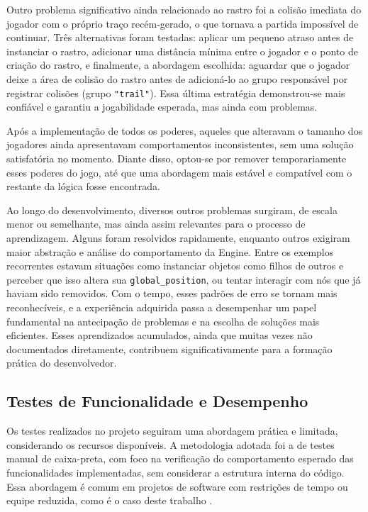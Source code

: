 Outro problema significativo ainda relacionado ao rastro foi a colisão imediata do jogador com o próprio traço recém-gerado, o que tornava a partida impossível de continuar. Três alternativas foram testadas: aplicar um pequeno atraso antes de instanciar o rastro, adicionar uma distância mínima entre o jogador e o ponto de criação do rastro, e finalmente, a abordagem escolhida: aguardar que o jogador deixe a área de colisão do rastro antes de adicioná-lo ao grupo responsável por registrar colisões (grupo \texttt{"trail"}). Essa última estratégia demonstrou-se mais confiável e garantiu a jogabilidade esperada, mas ainda com problemas.

Após a implementação de todos os poderes, aqueles que alteravam o tamanho dos jogadores ainda apresentavam comportamentos inconsistentes, sem uma solução satisfatória no momento. Diante disso, optou-se por remover temporariamente esses poderes do jogo, até que uma abordagem mais estável e compatível com o restante da lógica fosse encontrada.

Ao longo do desenvolvimento, diversos outros problemas surgiram, de escala menor ou semelhante, mas ainda assim relevantes para o processo de aprendizagem. Alguns foram resolvidos rapidamente, enquanto outros exigiram maior abstração e análise do comportamento da Engine. Entre os exemplos recorrentes estavam situações como instanciar objetos como filhos de outros e perceber que isso altera sua \texttt{global\_position}, ou tentar interagir com nós que já haviam sido removidos. Com o tempo, esses padrões de erro se tornam mais reconhecíveis, e a experiência adquirida passa a desempenhar um papel fundamental na antecipação de problemas e na escolha de soluções mais eficientes. Esses aprendizados acumulados, ainda que muitas vezes não documentados diretamente, contribuem significativamente para a formação prática do desenvolvedor.

\subsection{Testes de Funcionalidade e Desempenho}

Os testes realizados no projeto seguiram uma abordagem prática e limitada, considerando os recursos disponíveis. A metodologia adotada foi a de testes manual de caixa-preta, com foco na verificação do comportamento esperado das funcionalidades implementadas, sem considerar a estrutura interna do código. Essa abordagem é comum em projetos de software com restrições de tempo ou equipe reduzida, como é o caso deste trabalho \cite{pinheiro2024testes} \cite{checkpoint_blackbox}.

